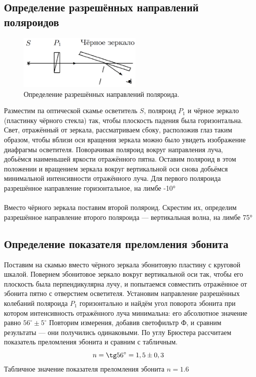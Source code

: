 \documentclass[a4paper,12pt]{article} %
\begin{document}
\subsection{Определение разрешённых направлений поляроидов}
\begin{figure}
	\includegraphics[width=6cm]{Screenshot_1.png}
	\caption{Определение разрешённых направлений поляроида.}
	\label{pic:1}
\end{figure}
Разместим па оптической скамье осветитель $ S $, поляроид $ P_1 $ и чёрное зеркало (пластинку чёрного стекла) так, чтобы плоскость падения была горизонтальна. Свет, отражённый от зеркала, рассматриваем сбоку, расположив глаз таким образом, чтобы вблизи оси вращения зеркала можно было увидеть изображение диафрагмы осветителя. Поворачивая поляроид вокруг направления луча, добьёмся наименьшей яркости отражённого пятна. Оставим поляроид в этом положении и вращением зеркала вокруг вертикальной оси снова добьёмся минимальной интенсивности отражённого луча.
Для первого поляроида разрешённое направление горизонтальное, на лимбе -10°
\\\\
Вместо чёрного зеркала поставим второй поляроид. Скрестим их, определим разрешённое направление второго поляроида --- вертикальная волна, на лимбе 75°

\subsection{Определение показателя преломления эбонита}
Поставим на скамью вместо чёрного зеркала эбонитовую пластину с круговой шкалой.
Повернем эбонитовое зеркало вокруг вертикальной оси так, чтобы его плоскость была перпендикулярна лучу, и попытаемся совместить отражённое от эбонита пятно с отверстием осветителя.
Установим направление разрешённых колебаний поляроида $ P_1 $ горизонтально и найдём угол поворота эбонита при котором интенсивность отражённого луча минимальна: его абсолютное значение равно $ 56^{\circ} \pm 5^{\circ} $
Повторим измерения, добавив светофильтр Ф, и сравним результаты --- они получились одинаковыми.
По углу Брюстера рассчитаем показатель преломления эбонита и сравним с табличным.
\begin{equation}\label{eq:1}
	n = \tg 56^{\circ} = 1,5 \pm 0,3
\end{equation}
Табличное значение показателя преломления эбонита $ n = 1.6 $
\newpage
\end{document}
